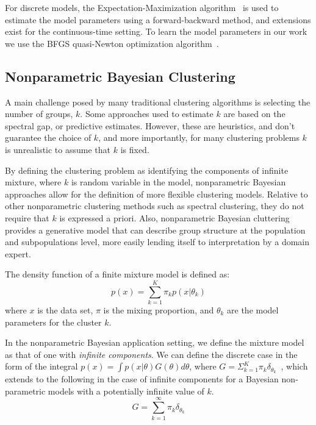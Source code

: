 For discrete models, the Expectation-Maximization algorithm~\cite{Dempster77} is used to estimate the model parameters using a forward-backward method, and extensions exist for the continuous-time setting.  To learn the model parameters in our work we use the BFGS quasi-Newton optimization algorithm~\cite{oAVR76a}.

\subsection{Nonparametric Bayesian Clustering}
A main challenge posed by many traditional clustering algorithms is selecting the number of groups, $k$.   Some approaches used to estimate $k$ are based on the spectral gap, or predictive estimates.  However, these are heuristics, and don't guarantee the choice of $k$, and more importantly, for many clustering problems $k$ is unrealistic to assume that $k$ is fixed.

By defining the clustering problem as identifying the components of infinite mixture, where $k$ is random variable in the model,  nonparametric Bayesian approaches allow for the definition of more flexible clustering models.  Relative to other nonparametric clustering methods such as spectral clustering, they do not require that $k$ is expressed a priori.  Also, nonparametric Bayesian cluttering provides a generative model that can describe group structure at the population and subpopulations level, more easily lending itself to interpretation by a domain expert.

The density function of a finite mixture model is defined as:
$$p(x) = \displaystyle\sum\limits_{k=1}^K \pi_k p(x|\theta_k)$$
where $x$ is the data set, $\pi$ is the mixing proportion, and $\theta_k$ are the model parameters for the cluster $k$.

In the nonparametric Bayesian application setting, we define the mixture model as that of one with \emph{infinite components}.  We can define the discrete case in the form of the integral $p(x) = \int p(x|\theta)G(\theta)d\theta$, where $G = \Sigma_{k=1}^K \pi_k \delta_{\theta_k}$~\cite{OrbanzT10}, which extends to the following in the case of infinite components for a Bayesian non-parametric models with a potentially infinite value of $k$.
  $$G = \displaystyle\sum_{k=1}^\infty \pi_k \delta_{\theta_k}$$

